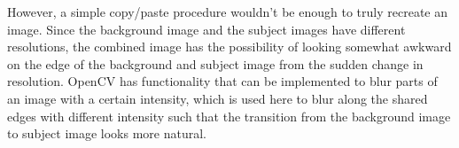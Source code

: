 However, a simple copy/paste procedure wouldn’t be enough to truly recreate an
image. Since the background image and the subject images have different
resolutions, the combined image has the possibility of looking somewhat awkward
on the edge of the background and subject image from the sudden change in
resolution. OpenCV has functionality that can be implemented to blur parts of an
image with a certain intensity, which is used here to blur along the shared
edges with different intensity such that the transition from the background
image to subject image looks more natural.
